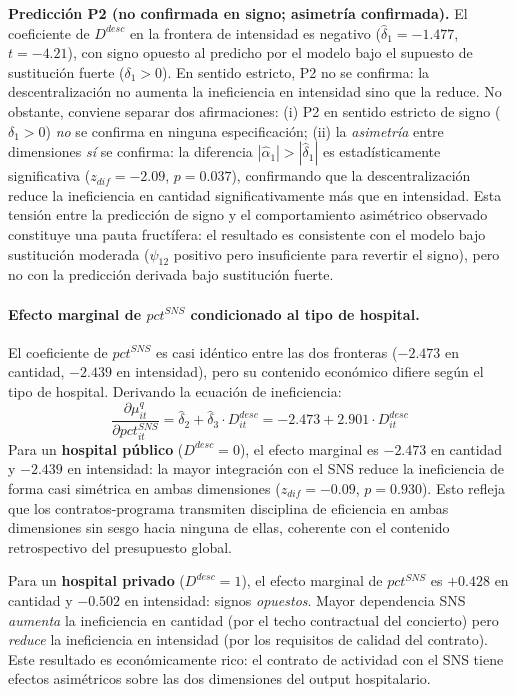 \textbf{Predicción P2 (no confirmada en signo; asimetría confirmada).} El coeficiente de $D^{desc}$ en la frontera de intensidad es negativo ($\hat{\delta}_1 = -1.477$, $t=-4.21$), con signo opuesto al predicho por el modelo bajo el supuesto de sustitución fuerte ($\delta_1 > 0$). En sentido estricto, P2 no se confirma: la descentralización no aumenta la ineficiencia en intensidad sino que la reduce. No obstante, conviene separar dos afirmaciones: (i) P2 en sentido estricto de signo ($\delta_1 > 0$) \textit{no} se confirma en ninguna especificación; (ii) la \textit{asimetría} entre dimensiones \textit{sí} se confirma: la diferencia $|\hat{\alpha}_1| > |\hat{\delta}_1|$ es estadísticamente significativa ($z_{dif}=-2.09$, $p=0.037$), confirmando que la descentralización reduce la ineficiencia en cantidad significativamente más que en intensidad. Esta tensión entre la predicción de signo y el comportamiento asimétrico observado constituye una pauta fructífera: el resultado es consistente con el modelo bajo sustitución moderada ($\psi_{12}$ positivo pero insuficiente para revertir el signo), pero no con la predicción derivada bajo sustitución fuerte.

\paragraph{Efecto marginal de $pct^{SNS}$ condicionado al tipo de hospital.}
El coeficiente de $pct^{SNS}$ es casi idéntico entre las dos fronteras ($-2.473$ en cantidad, $-2.439$ en intensidad), pero su contenido económico difiere según el tipo de hospital. Derivando la ecuación de ineficiencia:
\begin{equation}
  \frac{\partial \mu^q_{it}}{\partial pct^{SNS}_{it}} =
  \hat{\delta}_2 + \hat{\delta}_3 \cdot D^{desc}_{it} =
  -2.473 + 2.901 \cdot D^{desc}_{it}
  \label{eq:dpct_dq}
\end{equation}
Para un \textbf{hospital público} ($D^{desc}=0$), el efecto marginal es $-2.473$ en cantidad y $-2.439$ en intensidad: la mayor integración con el SNS reduce la ineficiencia de forma casi simétrica en ambas dimensiones ($z_{dif}=-0.09$, $p=0.930$). Esto refleja que los contratos-programa transmiten disciplina de eficiencia en ambas dimensiones sin sesgo hacia ninguna de ellas, coherente con el contenido retrospectivo del presupuesto global.

Para un \textbf{hospital privado} ($D^{desc}=1$), el efecto marginal de $pct^{SNS}$ es $+0.428$ en cantidad y $-0.502$ en intensidad: signos \textit{opuestos}. Mayor dependencia SNS \textit{aumenta} la ineficiencia en cantidad (por el techo contractual del concierto) pero \textit{reduce} la ineficiencia en intensidad (por los requisitos de calidad del contrato). Este resultado es económicamente rico: el contrato de actividad con el SNS tiene efectos asimétricos sobre las dos dimensiones del output hospitalario.

